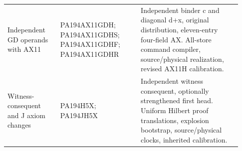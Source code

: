 \begin{longtable}{p{0.21\linewidth}p{0.32\linewidth}p{0.40\linewidth}}
Independent GD operands with AX11 & PA194AX11GDH; PA194AX11GDHS; PA194AX11GDHF; PA194AX11GDHR & Independent binder c and diagonal d+x, original distribution, eleven-entry four-field AX. All-store command compiler, source/physical realization, revised AX11H calibration.\\[4pt]
Witness-consequent and J axiom changes & PA194H5X; PA194JH5X & Independent witness consequent, optionally strengthened first head. Uniform Hilbert proof translations, explosion bootstrap, source/physical clocks, inherited calibration.\\[4pt]
\end{longtable}
\endgroup
